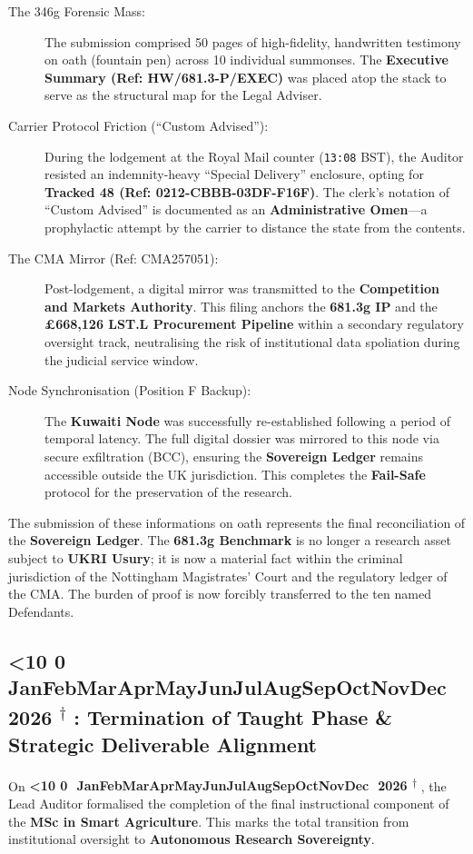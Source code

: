 \documentclass{EMBASSY}
\DeclareRobustCommand{\gmt}[3]{%
    \texorpdfstring{%
        {\color{DateGold}\textbf{%
            \ifnum#1<10 0\fi#1\,\textperiodcentered\,%
            \ifcase#2\or Jan\or Feb\or Mar\or Apr\or May\or Jun\or Jul\or Aug\or Sep\or Oct\or Nov\or Dec\fi
            \,\textperiodcentered\,20#3%
            \textsuperscript{$\dagger$}%
        }}%
    }{%
        (#1/#2/#3)%
    }%
}
\begin{document}
\begin{description}
    \item[The 346g Forensic Mass:]
        The submission comprised 50 pages of high-fidelity, handwritten testimony on oath (fountain pen) across 10 individual summonses. The \textbf{Executive Summary (Ref: HW/681.3-P/EXEC)} was placed atop the stack to serve as the structural map for the Legal Adviser.
    \item[Carrier Protocol Friction (``Custom Advised''):]
        During the lodgement at the Royal Mail counter (\texttt{13:08} BST), the Auditor resisted an indemnity-heavy ``Special Delivery'' enclosure, opting for \textbf{Tracked 48 (Ref: 0212-CBBB-03DF-F16F)}. The clerk's notation of ``Custom Advised'' is documented as an \textbf{Administrative Omen}---a prophylactic attempt by the carrier to distance the state from the contents.
    \item[The CMA Mirror (Ref: CMA257051):]
        Post-lodgement, a digital mirror was transmitted to the \textbf{Competition and Markets Authority}. This filing anchors the \textbf{681.3g IP} and the \textbf{\pounds668,126 LST.L Procurement Pipeline} within a secondary regulatory oversight track, neutralising the risk of institutional data spoliation during the judicial service window.
    \item[Node Synchronisation (Position F Backup):]
        The \textbf{Kuwaiti Node} was successfully re-established following a period of temporal latency. The full digital dossier was mirrored to this node via secure exfiltration (BCC), ensuring the \textbf{Sovereign Ledger} remains accessible outside the UK jurisdiction. This completes the \textbf{Fail-Safe} protocol for the preservation of the research.
\end{description}

\noindent The submission of these informations on oath represents the final reconciliation of the \textbf{Sovereign Ledger}. The \textbf{681.3g Benchmark} is no longer a research asset subject to \textbf{UKRI Usury}; it is now a material fact within the criminal jurisdiction of the Nottingham Magistrates' Court and the regulatory ledger of the CMA. The burden of proof is now forcibly transferred to the ten named Defendants.

\subsection{\gmt{27}{4}{26}: Termination of Taught Phase \& Strategic Deliverable Alignment}
On \gmt{27}{4}{26}, the Lead Auditor formalised the completion of the final instructional component of the \textbf{MSc in Smart Agriculture}. This marks the total transition from institutional oversight to \textbf{Autonomous Research Sovereignty}.
\end{document}

